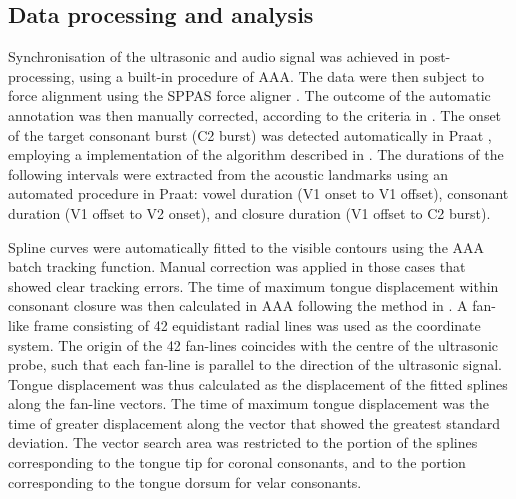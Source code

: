 \documentclass[authoryear, twocolumn]{elsarticle}
\begin{document}
\subsection{Data processing and
analysis}\label{data-processing-and-analysis}

Synchronisation of the ultrasonic and audio signal was achieved in
post-processing, using a built-in procedure of AAA. The data were then
subject to force alignment using the SPPAS force aligner
\citep{bigi2015}. The outcome of the automatic annotation was then
manually corrected, according to the criteria in .
The onset of the target consonant burst (C2 burst) was detected
automatically in Praat \citep{boersma2016}, employing a implementation
of the algorithm described in \citet{ananthapadmanabha2014}. The
durations of the following intervals were extracted from the acoustic
landmarks using an automated procedure in Praat: vowel duration (V1
onset to V1 offset), consonant duration (V1 offset to V2 onset), and
closure duration (V1 offset to C2 burst).


Spline curves were automatically fitted to the visible contours using
the AAA batch tracking function. Manual correction was applied in those
cases that showed clear tracking errors. The time of maximum tongue
displacement within consonant closure was then calculated in AAA
following the method in \citet{strycharczuk2015}. A fan-like frame
consisting of 42 equidistant radial lines was used as the coordinate
system. The origin of the 42 fan-lines coincides with the centre of the
ultrasonic probe, such that each fan-line is parallel to the direction
of the ultrasonic signal. Tongue displacement was thus calculated as the
displacement of the fitted splines along the fan-line vectors. The time
of maximum tongue displacement was the time of greater displacement
along the vector that showed the greatest standard deviation. The vector
search area was restricted to the portion of the splines corresponding
to the tongue tip for coronal consonants, and to the portion
corresponding to the tongue dorsum for velar consonants.
\end{document}
